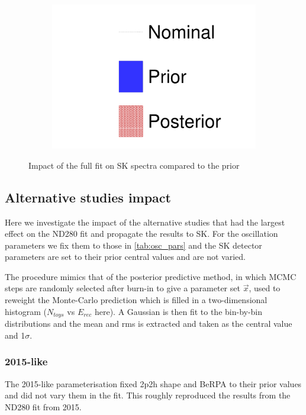 \begin{figure}[h]
\begin{subfigure}[t]{0.32\textwidth}
		\includegraphics[width=\textwidth, trim={0mm 0mm 0mm 0mm}, clip, page=4]{figures/mach3/data/prior_error_1june_try_2017_fit_on_sk_spectra}
	\end{subfigure}
	
	\caption{Impact of the full fit on SK spectra compared to the prior}
	\label{fig:sk_2017}
\end{figure}


\subsection{Alternative studies impact}
Here we investigate the impact of the alternative studies that had the largest effect on the ND280 fit and propagate the results to SK. For the oscillation parameters we fix them to those in \autoref{tab:osc_pars} and the SK detector parameters are set to their prior central values and are not varied.

The procedure mimics that of the posterior predictive method, in which MCMC steps are randomly selected after burn-in to give a parameter set $\vec{x}$, used to reweight the Monte-Carlo prediction which is filled in a two-dimensional histogram ($N_{toys}$ vs $E_{rec}$ here). A Gaussian is then fit to the bin-by-bin distributions and the mean and rms is extracted and taken as the central value and 1$\sigma$.

\subsubsection{2015-like}
The 2015-like parameterisation fixed 2p2h shape and BeRPA to their prior values and did not vary them in the fit. This roughly reproduced the results from the ND280 fit from 2015\cite{t2k_2015}. 

